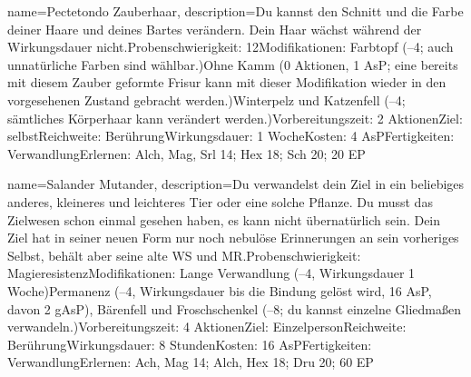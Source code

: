{
    name={Pectetondo Zauberhaar},
    description={Du kannst den Schnitt und die Farbe deiner Haare und deines Bartes verändern. Dein Haar wächst während der Wirkungsdauer nicht.\newline Probenschwierigkeit: 12\newline Modifikationen: Farbtopf (–4; auch unnatürliche Farben sind wählbar.)\newline Ohne Kamm (0 Aktionen, 1 AsP; eine bereits mit diesem Zauber geformte Frisur kann mit dieser Modifikation wieder in den vorgesehenen Zustand gebracht werden.)\newline Winterpelz und Katzenfell (–4; sämtliches Körperhaar kann verändert werden.)\newline Vorbereitungszeit: 2 Aktionen\newline Ziel: selbst\newline Reichweite: Berührung\newline Wirkungsdauer: 1 Woche\newline Kosten: 4 AsP\newline Fertigkeiten: Verwandlung\newline Erlernen: Alch, Mag, Srl 14; Hex 18; Sch 20; 20 EP}
}


{
    name={Salander Mutander},
    description={Du verwandelst dein Ziel in ein beliebiges anderes, kleineres und leichteres Tier oder eine solche Pflanze. Du musst das Zielwesen schon einmal gesehen haben, es kann nicht übernatürlich sein. Dein Ziel hat in seiner neuen Form nur noch nebulöse Erinnerungen an sein vorheriges Selbst, behält aber seine alte WS und MR.\newline Probenschwierigkeit: Magieresistenz\newline Modifikationen: Lange Verwandlung (–4, Wirkungsdauer 1 Woche)\newline Permanenz (–4, Wirkungsdauer bis die Bindung gelöst wird, 16 AsP, davon 2 gAsP), Bärenfell und Froschschenkel (–8; du kannst einzelne Gliedmaßen verwandeln.)\newline Vorbereitungszeit: 4 Aktionen\newline Ziel: Einzelperson\newline Reichweite: Berührung\newline Wirkungsdauer: 8 Stunden\newline Kosten: 16 AsP\newline Fertigkeiten: Verwandlung\newline Erlernen: Ach, Mag 14; Alch, Hex 18; Dru 20; 60 EP}
}


